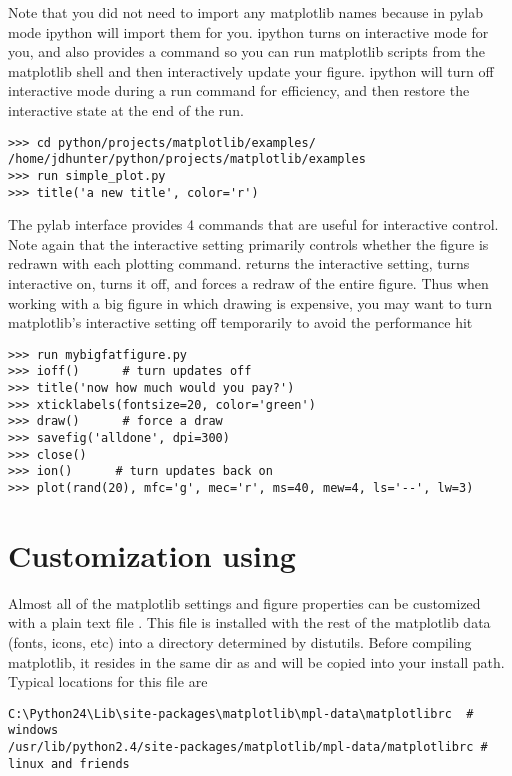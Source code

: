 \documentclass[twoside]{book}
\begin{document}
Note that you did not need to import any matplotlib names because in
pylab mode ipython will import them for you.  ipython turns on
interactive mode for you, and also provides a  command so
you can run matplotlib scripts from the matplotlib shell and then
interactively update your figure.  ipython will turn off interactive
mode during a run command for efficiency, and then restore the
interactive state at the end of the run.

\begin{lstlisting}
>>> cd python/projects/matplotlib/examples/
/home/jdhunter/python/projects/matplotlib/examples
>>> run simple_plot.py
>>> title('a new title', color='r')
\end{lstlisting}

The pylab interface provides 4 commands that are useful for
interactive control.  Note again that the interactive setting
primarily controls whether the figure is redrawn with each plotting
command.   returns the interactive setting,
 turns interactive on,  turns it off, and
 forces a redraw of the entire figure.  Thus when working
with a big figure in which drawing is expensive, you may want to turn
matplotlib's interactive setting off temporarily to avoid the
performance hit

\begin{lstlisting}
>>> run mybigfatfigure.py
>>> ioff()      # turn updates off
>>> title('now how much would you pay?')
>>> xticklabels(fontsize=20, color='green')
>>> draw()      # force a draw
>>> savefig('alldone', dpi=300)
>>> close()
>>> ion()      # turn updates back on
>>> plot(rand(20), mfc='g', mec='r', ms=40, mew=4, ls='--', lw=3)
\end{lstlisting}

\section{Customization using }
\label{sec:matplotlibrc}

Almost all of the matplotlib settings and figure properties can be
customized with a plain text file .  This file is
installed with the rest of the matplotlib data (fonts, icons, etc)
into a directory determined by distutils.  Before compiling
matplotlib, it resides in the same dir as  and will be
copied into your install path.  Typical locations for this file are

\begin{verbatim}
C:\Python24\Lib\site-packages\matplotlib\mpl-data\matplotlibrc  # windows
/usr/lib/python2.4/site-packages/matplotlib/mpl-data/matplotlibrc # linux and friends  
\end{verbatim}
\end{document}
